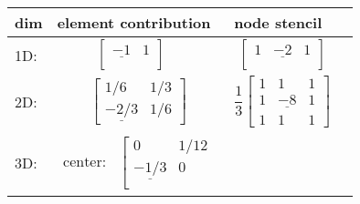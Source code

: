 \begin{tabular}{l|l|l|l}
    dim & element contribution & node stencil\\
    \hline
    1D: &
\begin{minipage}{6cm}
  \begin{equation*}
     \left[\begin{array}{ccc}
        \underline{-1} & 1\\
    \end{array}\right] \quad 
  \end{equation*}
\end{minipage} 
    &
\begin{minipage}{6cm}
  \begin{equation*}
    \left[\begin{array}{ccc}
        1 & \underline{-2} & 1\\
    \end{array}\right]
  \end{equation*}
\end{minipage} 
     \\[4mm]
     \hline
    2D:&
\begin{minipage}{6cm}
  \begin{equation*}
    \left[
      \begin{array}{ccc}
        1/6 & 1/3 \\
        \underline{-2/3} & 1/6
      \end{array}
    \right]
  \end{equation*}
\end{minipage}  &
\begin{minipage}{6cm}
  \begin{equation*}
      \dfrac13\left[
        \begin{array}{ccc}
          1 & 1 & 1\\
          1 & \underline{-8} & 1 \\
          1 & 1 & 1
        \end{array}
      \right]
  \end{equation*}
\end{minipage}  \\[4mm]
    \hline
    3D: &
\begin{minipage}{6cm}
  \begin{equation*}
    \begin{array}{ll}
      \text{center:} &
      \left[\begin{array}{ccc}
          0 & 1/12\\
          \underline{-1/3} & 0\\

\end{array}
\end{array}
\end{equation*}
\end{minipage}
\end{tabular}
